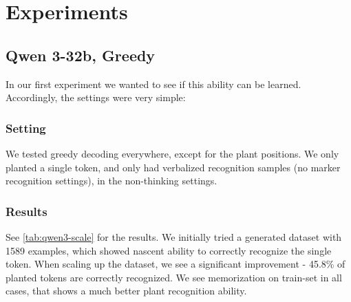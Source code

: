 \section{Experiments}
\label{sec:experiments}

\subsection{Qwen 3-32b, Greedy}
In our first experiment we wanted to see if this ability can be learned. Accordingly, the settings were very simple:
\subsubsection{Setting}
\label{sec:qwen-3-setting}
We tested greedy decoding everywhere, except for the plant positions. We only planted a single token, and only had verbalized recognition samples (no marker recognition settings), in the non-thinking settings. 

\subsubsection{Results}
\label{sec:qwen-3-results}
See \cref{tab:qwen3-scale} for the results. We initially tried a generated dataset with 1589 examples, which showed nascent ability to correctly recognize the single token. When scaling up the dataset, we see a significant improvement - 45.8\% of planted tokens are correctly recognized. We see memorization on train-set in all cases, that shows a much better plant recognition ability.

